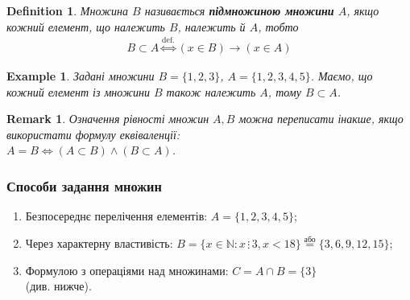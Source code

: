 \documentclass[a4paper, 14pt]{extarticle}
\theoremstyle{theoremdd}
\theoremstyle{theoremdd}
\newtheorem{definition}[theorem]{Definition}
\theoremstyle{theoremdd}
\theoremstyle{theoremdd}
\theoremstyle{theoremdd}
\newtheorem{example}[theorem]{Example}
\theoremstyle{theoremdd}
\theoremstyle{theoremdd}
\theoremstyle{theoremdd}
\theoremstyle{theoremdd}
\theoremstyle{theoremdd}
\theoremstyle{theoremdd}
\newtheorem{remark}[theorem]{Remark}
\theoremstyle{theoremdd}
\theoremstyle{theoremdd}
\theoremstyle{theoremdd}
\theoremstyle{theoremdd}
\begin{document}
\begin{definition}
Множина $B$ називається \textbf{підмножиною множини} $A$, якщо кожний елемент, що належить $B$, належить й $A$, тобто
\begin{align*}
B \subset A \overset{\text{def.}}{\iff} (x \in B) \rightarrow (x \in A)
\end{align*}
\end{definition}

\begin{example}
Задані множини $B = \{1,2,3\}$, $A = \{1,2,3,4,5\}$. Маємо, що кожний елемент із множини $B$ також належить $A$, тому $B \subset A$.
\end{example}

\begin{remark}
Означення рівності множин $A,B$ можна переписати інакше, якщо використати формулу еквіваленції: \\
$A=B \iff (A \subset B) \wedge (B \subset A)$.
\end{remark}

\subsubsection*{Способи задання множин}
\begin{enumerate}[nosep,wide=0pt,label={\arabic*.}]
\item Безпосереднє перелічення елементів: $A = \{1,2,3,4,5\}$;
\item Через характерну властивість: $B = \{ x \in \mathbb{N}: x \,\vdots\, 3, x < 18 \} \overset{\text{або}}{=} \{3,6,9,12,15\}$;
\item Формулою з операціями над множинами: $C = A \cap B = \{3\}$ \\
(див. нижче).
\end{enumerate}
\end{document}

